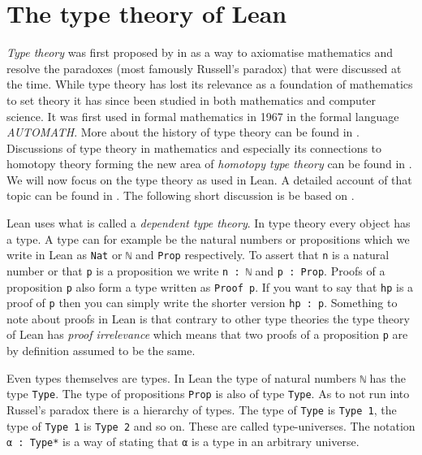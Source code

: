 \section{The type theory of Lean}
\label{sec:typetheory}

\emph{Type theory} was first proposed by  in \citeyear{Russell1908} \cite{Russell1908} as a way to axiomatise mathematics and resolve the paradoxes (most famously Russell's paradox) that were discussed at the time. 
While type theory has lost its relevance as a foundation of mathematics to set theory it has since been studied in both mathematics and computer science. 
It was first used in formal mathematics in 1967 in the formal language \emph{AUTOMATH}. 
More about the history of type theory can be found in \cite{Kamareddine2004}. 
Discussions of type theory in mathematics and especially its connections to homotopy theory forming the new area of \emph{homotopy type theory} can be found in \cite{hottbook}.
We will now focus on the type theory as used in Lean.
A detailed account of that topic can be found in \cite{Carneiro2019}. 
The following short discussion is be based on \cite{Avigad2024}. 

Lean uses what is called a \emph{dependent type theory}.
In type theory every object has a type. 
A type can for example be the natural numbers or propositions which we write in Lean as \lstinline{Nat} or \lstinline{ℕ} and \lstinline{Prop} respectively.
To assert that \lstinline{n} is a natural number or that \lstinline{p} is a proposition we write \lstinline{n : ℕ} and \lstinline{p : Prop}. 
Proofs of a proposition \lstinline{p} also form a type written as \lstinline{Proof p}.
If you want to say that \lstinline{hp} is a proof of \lstinline{p} then you can simply write the shorter version \lstinline{hp : p}.
Something to note about proofs in Lean is that contrary to other type theories the type theory of Lean has \emph{proof irrelevance} which means that two proofs of a proposition \lstinline{p} are by definition assumed to be the same.

Even types themselves are types. 
In Lean the type of natural numbers \lstinline{ℕ} has the type \lstinline{Type}. 
The type of propositions \lstinline{Prop} is also of type \lstinline{Type}.
As to not run into Russel's paradox there is a hierarchy of types. 
The type of \lstinline{Type} is \lstinline{Type 1}, the type of \lstinline{Type 1} is \lstinline{Type 2} and so on.
These are called type-universes. 
The notation \lstinline{α : Type*} is a way of stating that \lstinline{α} is a type in an arbitrary universe.

